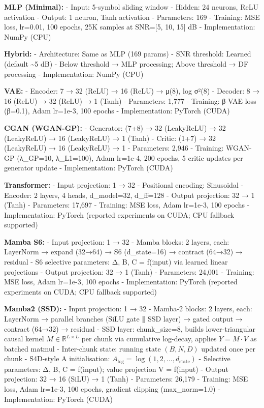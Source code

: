 \textbf{MLP (Minimal):} - Input: 5-symbol sliding window - Hidden: 24 neurons, ReLU activation - Output: 1 neuron, Tanh activation - Parameters: 169 - Training: MSE loss, lr=0.01, 100 epochs, 25K samples at SNR={[}5, 10, 15{]} dB - Implementation: NumPy (CPU)

\textbf{Hybrid:} - Architecture: Same as MLP (169 params) - SNR threshold: Learned (default \textasciitilde5 dB) - Below threshold → MLP processing; Above threshold → DF processing - Implementation: NumPy (CPU)

\textbf{VAE:} - Encoder: 7 → 32 (ReLU) → 16 (ReLU) → μ(8), log σ²(8) - Decoder: 8 → 16 (ReLU) → 32 (ReLU) → 1 (Tanh) - Parameters: 1,777 - Training: β-VAE loss (β=0.1), Adam lr=1e-3, 100 epochs - Implementation: PyTorch (CUDA)

\textbf{CGAN (WGAN-GP):} - Generator: (7+8) → 32 (LeakyReLU) → 32 (LeakyReLU) → 16 (LeakyReLU) → 1 (Tanh) - Critic: (1+7) → 32 (LeakyReLU) → 16 (LeakyReLU) → 1 - Parameters: 2,946 - Training: WGAN-GP (λ\_GP=10, λ\_L1=100), Adam lr=1e-4, 200 epochs, 5 critic updates per generator update - Implementation: PyTorch (CUDA)

\textbf{Transformer:} - Input projection: 1 → 32 - Positional encoding: Sinusoidal - Encoder: 2 layers, 4 heads, d\_model=32, d\_ff=128 - Output projection: 32 → 1 (Tanh) - Parameters: 17,697 - Training: MSE loss, Adam lr=1e-3, 100 epochs - Implementation: PyTorch (reported experiments on CUDA; CPU fallback supported)

\textbf{Mamba S6:} - Input projection: 1 → 32 - Mamba blocks: 2 layers, each: LayerNorm → expand (32→64) → S6 (d\_state=16) → contract (64→32) → residual - S6 selective parameters: Δ, B, C = f(input) via learned linear projections - Output projection: 32 → 1 (Tanh) - Parameters: 24,001 - Training: MSE loss, Adam lr=1e-3, 100 epochs - Implementation: PyTorch (reported experiments on CUDA; CPU fallback supported)

\textbf{Mamba2 (SSD):} - Input projection: 1 → 32 - Mamba-2 blocks: 2 layers, each: LayerNorm → parallel branches (SiLU gate ∥ SSD layer) → gated output → contract (64→32) → residual - SSD layer: chunk\_size=8, builds lower-triangular causal kernel \(M \in \mathbb{R}^{L \times L}\) per chunk via cumulative log-decay, applies \(Y = M \cdot V\) as batched matmul - Inter-chunk state: running state \((B, N, D)\) updated once per chunk - S4D-style A initialisation: \(A_{\log} = \log(1, 2, \dots, d_{\text{state}})\) - Selective parameters: Δ, B, C = f(input); value projection V = f(input) - Output projection: 32 → 16 (SiLU) → 1 (Tanh) - Parameters: 26,179 - Training: MSE loss, Adam lr=1e-3, 100 epochs, gradient clipping (max\_norm=1.0) - Implementation: PyTorch (CUDA)

